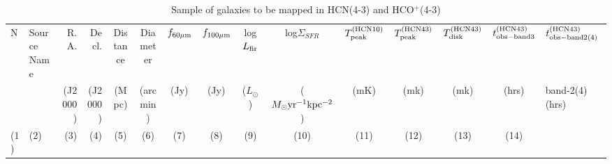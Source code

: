 



\begin{table*}
\caption{Sample of galaxies to be mapped in HCN(4-3) and HCO$^+$(4-3)}
\label{tbl:sample}
\centering
\scriptsize
\addtolength{\tabcolsep}{-4.5pt}

\begin{threeparttable}[b]
\begin{tabular}{llrrccccccccccl}
\hline
\hline

N & Source Name & R.A. & Decl. & Distance & Diameter & $f_{\rm 60\mu m}$ & $f_{\rm 100\mu m}$ & log$L_{\rm fir}$ & log$\Sigma_{SFR}$ & $T_{\rm peak}^{\rm (HCN10)}$ & $T_{\rm peak}^{\rm (HCN43)}$ & $T_{\rm disk}^{\rm (HCN43)}$  & $t_{\rm obs-band3}^{\rm (HCN43)}$ & $t_{\rm obs-band2(4)}^{\rm (HCN43)}$ \\

  &  & (J2000) & (J2000) & (Mpc) & (arcmin) & (Jy) & (Jy) & ($L_\odot$) & ($M_{\odot} \rm yr^{-1} kpc^{-2}$) & (mK) & (mk) & (mk) & (hrs) & band-2(4)(hrs) \\

(1) & (2)  & (3) & (4) & (5) & (6) & (7) & (8) & (9) & (10) & (11) & (12) & (13) & (14)  \\

\hline


\end{tabular}
\end{threeparttable}
\end{table*}
